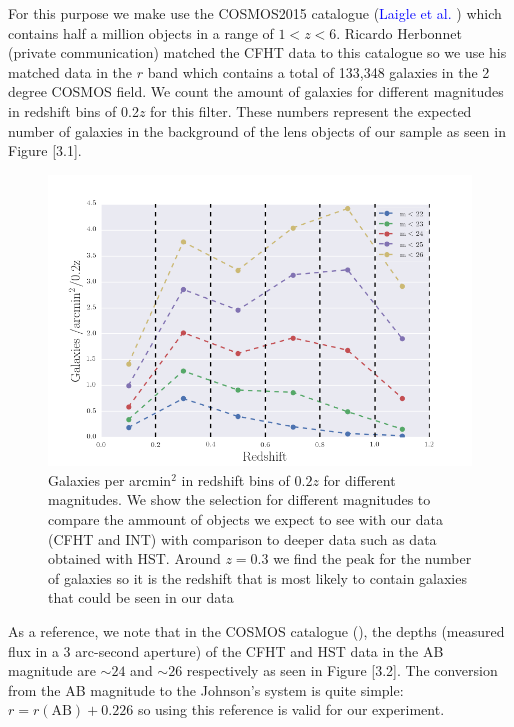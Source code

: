 For this purpose we make use the COSMOS2015 catalogue (\textcolor{blue}{Laigle et al.} \citeyear{Reference21}) which contains half a million objects in a range of $1<z<6$. Ricardo Herbonnet (private communication) matched the CFHT data to this catalogue so we use his matched data in the $r$ band which contains a total of 133,348 galaxies in the 2 degree COSMOS field. We count the amount of galaxies for different magnitudes in redshift bins of 0.2$z$ for this filter. These numbers represent the expected number of galaxies in the background of the lens objects of our sample as seen in Figure [3.1]. 

\begin{figure}[H]
\centering
\includegraphics[width=12cm]{images/galaxies_per_arcmin.png}
\caption[Galaxies per arcmin]{Galaxies per arcmin$^2$ in redshift bins of $0.2z$ for different magnitudes. We show the selection for different magnitudes to compare the ammount of objects we expect to see with our data (CFHT and INT) with comparison to deeper data such as data obtained with HST. Around $z=0.3$ we find the peak for the number of galaxies so it is the redshift that is most likely to contain galaxies that could be seen in our data}
\end{figure}

As a reference, we note that in the COSMOS catalogue (\citeyear{Reference35}), the depths (measured flux in a 3 arc-second aperture) of the CFHT and HST data in the AB magnitude are $\sim  24$ and $\sim 26$ respectively as seen in Figure [3.2]. The conversion from the AB magnitude to the Johnson's system is quite simple: $r =   r(\text{AB}) + 0.226$ so using this reference is valid for our experiment.

